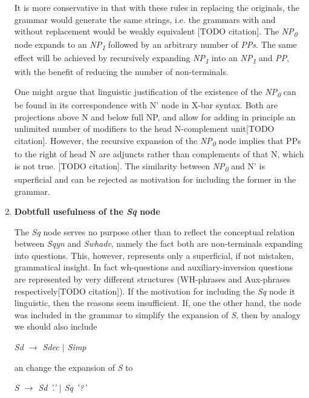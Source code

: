 \documentclass{article}
\begin{document}
\begin{enumerate}
		It is more conservative in that with these rules in replacing the originals, the grammar would generate the same strings, i.e. the grammars with and without replacement would be weakly equivalent [TODO citation].
		The \emph{NP\textsubscript{0}} node expands to an \emph{NP\textsubscript{1}} followed by an arbitrary number of \emph{PPs}. The same effect will be achieved by recursively expanding \emph{NP\textsubscript{1}}  into an \emph{NP\textsubscript{1}} and  \emph{PP}, with the benefit of reducing the number of non-terminals.
		
		One might argue that linguistic justification of the existence of the \emph{NP\textsubscript{0}} can be found in its correspondence with N' node in X-bar syntax. Both are projections above N and below full NP, and allow for adding in principle an unlimited number of modifiers to the head N-complement unit[TODO citation]. However, the recursive expansion of the \emph{NP\textsubscript{0}} node implies that PPs to the right of head N are adjuncts rather than complements of that N, which is not true. [TODO citation]. The similarity between \emph{NP\textsubscript{0}} and N' is superficial and can be rejected as motivation for including the former in the grammar. 
		
		\item
		\textbf{Dobtfull usefulness of the \textit{Sq} node}
		
		The \emph{Sq} node serves no purpose other than to reflect the conceptual relation between \emph{Sqyn} and \emph{Swhadv}, namely the fact both are non-terminals expanding into questions. This, however, represents only a superficial, if not mistaken, grammatical insight. In fact wh-questions and auxiliary-inversion questions are represented by very different structures (WH-phrases and Aux-phrases respectively[TODO citation]). If the motivation for including the \emph{Sq} node it linguistic, then the reasons seem insufficient.
		If, one the other hand, the node was included in the grammar to simplify the expansion of \emph{S}, then by analogy we should also include
		\begin{center}
			
			\emph{Sd $\rightarrow$ Sdec $\vert$ Simp}
			
		\end{center}an change the expansion of \emph{S} to
		\begin{center}
			
			\emph{S $\rightarrow$ Sd '.' $\vert$ Sq '?'}
			
		\end{center}
		

\end{enumerate}
\end{document}
